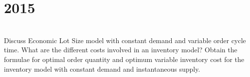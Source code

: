 \section*{2015}
\vspace{-.5cm}
\hrulefill \smallskip\\
 Discuss Economic Lot Size model with constant demand and variable order cycle time.
\myline
{} What are the different costs involved in an inventory model? Obtain the formulae for optimal order quantity and optimum variable inventory cost for the inventory model with constant demand and instantaneous supply.
